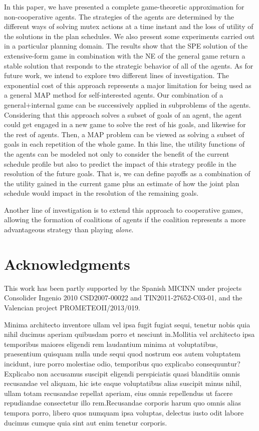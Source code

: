 \documentclass[letterpaper]{article}
\begin{document}
In this paper, we have presented a complete game-theoretic approximation for non-cooperative agents. The strategies of the agents are determined by the different ways of solving mutex actions at a time instant and the loss of utility of the solutions in the plan schedules. We also present some experiments carried out in a particular planning domain. The results show that the SPE solution of the extensive-form game in combination with the NE of the general game return a stable solution that responds to the strategic behavior of all of the agents.  As for future work, we intend to explore two different lines of investigation. The exponential cost of this approach represents a major limitation for being used as a general MAP method for self-interested agents. Our combination of a general+internal game can be successively applied in subproblems of the agents. Considering that this approach solves a subset of goals of an agent, the agent could get engaged in a new game to solve the rest of his goals, and likewise for the rest of agents. Then, a MAP problem can be viewed as solving a subset of goals in each repetition of the whole game. In this line, the utility functions of the agents can be modeled not only to consider the benefit of the current schedule profile but also to predict the impact of this strategy profile in the resolution of the future goals. That is, we can define payoffs as a combination of the utility gained in the current game plus an estimate of how the joint plan schedule would impact in the resolution of the remaining goals.

Another line of investigation is to extend this approach to cooperative games, allowing the formation of coalitions of agents if the coalition represents a more advantageous strategy than playing \emph{alone}.

\vspace{-3.63mm}
\section*{ Acknowledgments}
This work has been partly supported by the Spanish MICINN under projects Consolider Ingenio 2010 CSD2007-00022 and TIN2011-27652-C03-01, and the Valencian project PROMETEOII/2013/019.




  Minima architecto inventore ullam vel ipsa fugit fugiat sequi, tenetur nobis quia nihil ducimus aperiam quibusdam porro et nesciunt in.Mollitia vel architecto ipsa temporibus maiores eligendi rem laudantium minima at voluptatibus, praesentium quisquam nulla unde sequi quod nostrum eos autem voluptatem incidunt, iure porro molestiae odio, temporibus quo explicabo consequuntur?Explicabo non accusamus suscipit eligendi perspiciatis quasi blanditiis omnis recusandae vel aliquam, hic iste eaque voluptatibus alias suscipit minus nihil, ullam totam recusandae repellat aperiam, eius omnis repellendus ut facere repudiandae consectetur illo rem.Recusandae corporis harum quo omnis alias tempora porro, libero quos numquam ipsa voluptas, delectus iusto odit labore ducimus cumque quia sint aut enim tenetur corporis.\clearpage

\end{document}

